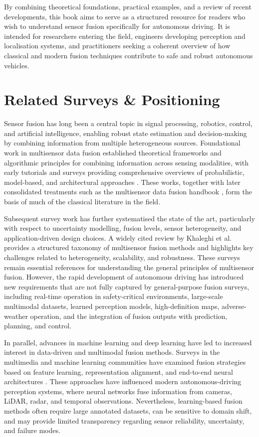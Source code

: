 By combining theoretical foundations, practical examples, and a review of recent developments, this book aims to serve as a structured resource for readers who wish to understand sensor fusion specifically for autonomous driving. It is intended for researchers entering the field, engineers developing perception and localisation systems, and practitioners seeking a coherent overview of how classical and modern fusion techniques contribute to safe and robust autonomous vehicles. 

\section{Related Surveys \& Positioning}
\label{subsec:related}

Sensor fusion has long been a central topic in signal processing, robotics, control, and artificial intelligence, enabling robust state estimation and decision-making by combining information from multiple heterogeneous sources. Foundational work in multisensor data fusion established theoretical frameworks and algorithmic principles for combining information across sensing modalities, with early tutorials and surveys providing comprehensive overviews of probabilistic, model-based, and architectural approaches \cite{hall_introduction_1997, luo_multisensor_1989}. These works, together with later consolidated treatments such as the multisensor data fusion handbook \cite{liggins_handbook_2009}, form the basis of much of the classical literature in the field.

Subsequent survey work has further systematised the state of the art, particularly with respect to uncertainty modelling, fusion levels, sensor heterogeneity, and application-driven design choices. A widely cited review by Khaleghi et al. \cite{khaleghi_multisensor_2013} provides a structured taxonomy of multisensor fusion methods and highlights key challenges related to heterogeneity, scalability, and robustness. These surveys remain essential references for understanding the general principles of multisensor fusion. However, the rapid development of autonomous driving has introduced new requirements that are not fully captured by general-purpose fusion surveys, including real-time operation in safety-critical environments, large-scale multimodal datasets, learned perception models, high-definition maps, adverse-weather operation, and the integration of fusion outputs with prediction, planning, and control.

In parallel, advances in machine learning and deep learning have led to increased interest in data-driven and multimodal fusion methods. Surveys in the multimedia and machine learning communities have examined fusion strategies based on feature learning, representation alignment, and end-to-end neural architectures \cite{atrey_multimodal_2010, baltrusaitis_multimodal_2019}. These approaches have influenced modern autonomous-driving perception systems, where neural networks fuse information from cameras, LiDAR, radar, and temporal observations. Nevertheless, learning-based fusion methods often require large annotated datasets, can be sensitive to domain shift, and may provide limited transparency regarding sensor reliability, uncertainty, and failure modes.

